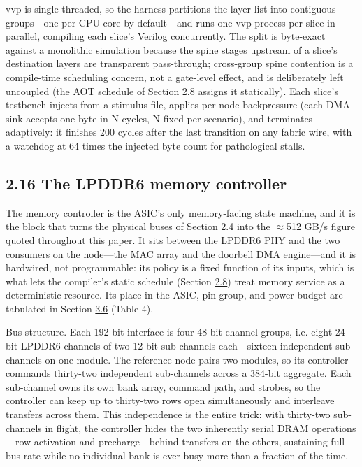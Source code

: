 \documentclass[12pt,onecolumn]{article}
\begin{document}
vvp is single-threaded, so the harness partitions the layer list into contiguous groups---one per CPU core by default---and runs one vvp process per slice in parallel, compiling each slice's Verilog concurrently. The split is byte-exact against a monolithic simulation because the spine stages upstream of a slice's destination layers are transparent pass-through; cross-group spine contention is a compile-time scheduling concern, not a gate-level effect, and is deliberately left uncoupled (the AOT schedule of Section \hyperref[sec:2.8]{2.8} assigns it statically). Each slice's testbench injects from a stimulus file, applies per-node backpressure (each DMA sink accepts one byte in N cycles, N fixed per scenario), and terminates adaptively: it finishes 200 cycles after the last transition on any fabric wire, with a watchdog at 64 times the injected byte count for pathological stalls.

\subsection*{2.16 The LPDDR6 memory controller}\label{sec:2.16}

The memory controller is the ASIC's only memory-facing state machine, and it is the block that turns the physical buses of Section \hyperref[sec:2.4]{2.4} into the $\approx$512 GB/s figure quoted throughout this paper. It sits between the LPDDR6 PHY and the two consumers on the node---the MAC array and the doorbell DMA engine---and it is hardwired, not programmable: its policy is a fixed function of its inputs, which is what lets the compiler's static schedule (Section \hyperref[sec:2.8]{2.8}) treat memory service as a deterministic resource. Its place in the ASIC, pin group, and power budget are tabulated in Section \hyperref[sec:3.6]{3.6} (Table 4).

Bus structure. Each 192-bit interface is four 48-bit channel groups, i.e. eight 24-bit LPDDR6 channels of two 12-bit sub-channels each---sixteen independent sub-channels on one module. The reference node pairs two modules, so its controller commands thirty-two independent sub-channels across a 384-bit aggregate. Each sub-channel owns its own bank array, command path, and strobes, so the controller can keep up to thirty-two rows open simultaneously and interleave transfers across them. This independence is the entire trick: with thirty-two sub-channels in flight, the controller hides the two inherently serial DRAM operations---row activation and precharge---behind transfers on the others, sustaining full bus rate while no individual bank is ever busy more than a fraction of the time.
\end{document}
